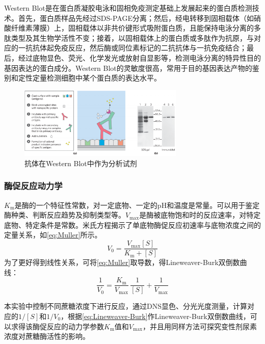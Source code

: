 Western Blot是在蛋白质凝胶电泳和固相免疫测定基础上发展起来的蛋白质检测技术。首先，蛋白质样品先经过SDS-PAGE分离；然后，经电转移到固相载体（如硝酸纤维素薄膜）上，固相载体以非共价键形式吸附蛋白质，且能保持电泳分离的多肽类型及其生物学活性不变；接着，以固相载体上的蛋白质或多肽作为抗原，与对应的一抗抗体起免疫反应，然后酶或同位素标记的二抗抗体与一抗免疫结合；最后，经过底物显色、荧光、化学发光或放射自显影等，检测电泳分离的特异性目的基因表达的蛋白成分。Western Blot的灵敏度很高，常用于目的基因表达产物的鉴别和定性定量检测细胞中某个蛋白质的表达水平。

\begin{figure}[H]
    \centering
    \includegraphics[width = 0.7\textwidth]{figure/Some Pictures/Antibodies as analytical reagents.png}
    \caption{抗体在Western Blot中作为分析试剂~\cite{nelson2021lehninger}}
    \label{fig:enter-label}
\end{figure}

\subsubsection{酶促反应动力学}
\par $K_\mathrm{m}$是酶的一个特征性常数，对一定底物、一定的pH和温度是常量。可以用于鉴定酶种类、判断反应趋势及抑制类型等。$V_\text{max}$是酶被底物饱和时的反应速率，对特定底物、特定条件是常数。米氏方程揭示了单底物酶促反应初速率与底物浓度之间的定量关系，如\autoref{eq:Muller}所示。
\begin{equation}
    V_0 = \frac{V_\text{max}[S]}{K_\text{m} + [S]}
    \label{eq:Muller}
\end{equation}
为了更好得到线性关系，可将\autoref{eq:Muller}取导数，得Lineweaver-Burk双倒数曲线：
\begin{equation}
    \frac{1}{V_0} = \frac{K_\text{m}}{V_\text{max}}\,\frac{1}{[S]} + \frac{1}{V_\text{max}}
    \label{eq:Lineweaver-Burk}
\end{equation}
\par 本实验中控制不同蔗糖浓度下进行反应，通过DNS显色、分光光度测量，计算对应的$1/[S]$和$1/V_0$，根据\autoref{eq:Lineweaver-Burk}作Lineweaver-Burk双倒数曲线，可以求得该酶促反应的动力学参数$K_\text{m}$值和$V_\text{max}$，并且用同样方法可探究变性剂尿素浓度对蔗糖酶活性的影响。

